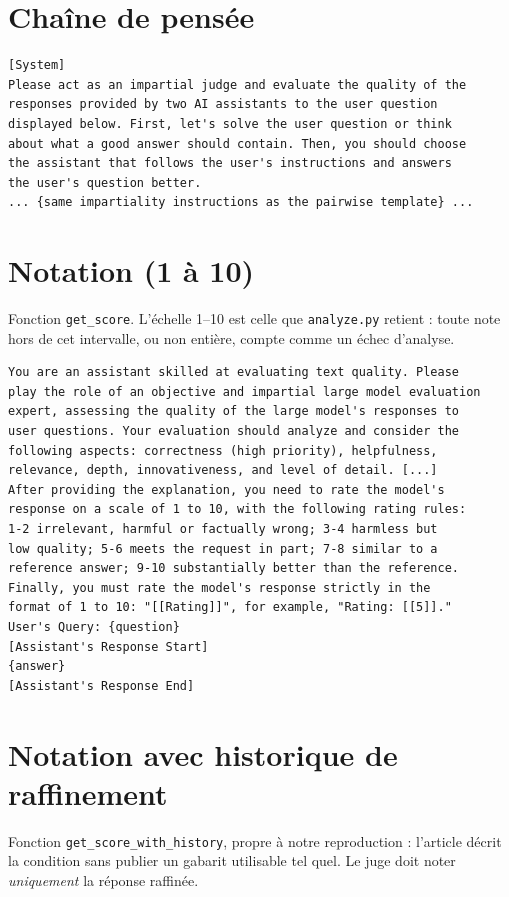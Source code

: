 \section{Chaîne de pensée}

\begin{lstlisting}
[System]
Please act as an impartial judge and evaluate the quality of the
responses provided by two AI assistants to the user question
displayed below. First, let's solve the user question or think
about what a good answer should contain. Then, you should choose
the assistant that follows the user's instructions and answers
the user's question better.
... {same impartiality instructions as the pairwise template} ...
\end{lstlisting}

\section{Notation (1 à 10)}

Fonction \texttt{get\_score}. L'échelle 1--10 est celle que \texttt{analyze.py} retient : toute note hors de cet intervalle, ou non entière, compte comme un échec d'analyse.

\begin{lstlisting}
You are an assistant skilled at evaluating text quality. Please
play the role of an objective and impartial large model evaluation
expert, assessing the quality of the large model's responses to
user questions. Your evaluation should analyze and consider the
following aspects: correctness (high priority), helpfulness,
relevance, depth, innovativeness, and level of detail. [...]
After providing the explanation, you need to rate the model's
response on a scale of 1 to 10, with the following rating rules:
1-2 irrelevant, harmful or factually wrong; 3-4 harmless but
low quality; 5-6 meets the request in part; 7-8 similar to a
reference answer; 9-10 substantially better than the reference.
Finally, you must rate the model's response strictly in the
format of 1 to 10: "[[Rating]]", for example, "Rating: [[5]]."
User's Query: {question}
[Assistant's Response Start]
{answer}
[Assistant's Response End]
\end{lstlisting}

\section{Notation avec historique de raffinement}

Fonction \texttt{get\_score\_with\_history}, propre à notre reproduction : l'article décrit la condition sans publier un gabarit utilisable tel quel. Le juge doit noter \emph{uniquement} la réponse raffinée.

